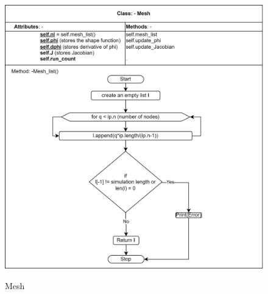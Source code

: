 \begin{figure}[htb]
  \centering
  \includegraphics[width=13cm]{img/Mesh.png}\\
  \caption{Mesh}
  \label{fig:Mesh}
\end{figure}

